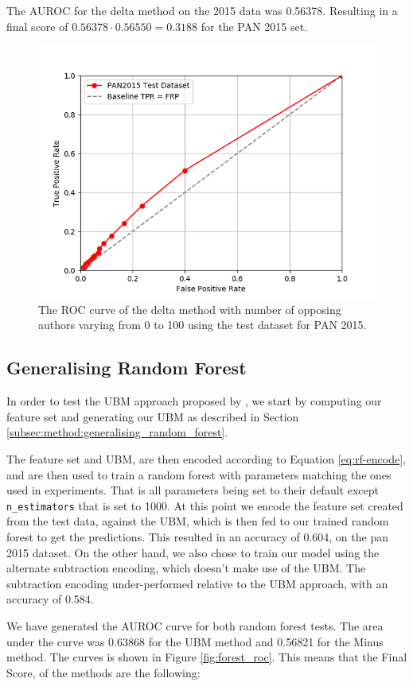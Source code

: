 The \gls{AUROC} for the delta method on the 2015 data was 0.56378. Resulting
in a final score of $0.56378 \cdot 0.56550 = 0.3188$ for the PAN 2015 set.

\begin{figure}
    \centering
    \includegraphics[width=.7\textwidth]{./pictures/delta_method_roc.png}
    \caption{The ROC curve of the delta method with number of opposing authors
    varying from 0 to 100 using the test dataset for PAN 2015.}
    \label{fig:delta_method_roc}
\end{figure}

\subsection{Generalising Random Forest} \label{subsec:results:generalising_random_forest}
In order to test the \gls{UBM} approach proposed by \cite{pacheco2015}, we start
by computing our feature set and generating our \gls{UBM} as described in
Section \ref{subsec:method:generalising_random_forest}.

The feature set and \gls{UBM}, are then encoded according to Equation
\eqref{eq:rf-encode}, and are then used to train a random forest with parameters
matching the ones used in experiments. That is all parameters being set to their
default except \texttt{n\_estimators} that is set to 1000. At this point we
encode the feature set created from the test data, against the \gls{UBM}, which
is then fed to our trained random forest to get the predictions. This resulted
in an accuracy of 0.604, on the pan 2015 dataset. On the other hand, we also
chose to train our model using the alternate subtraction encoding, which doesn't
make use of the \gls{UBM}. The subtraction encoding under-performed relative to
the \gls{UBM} approach, with an accuracy of 0.584.

We have generated the \gls{AUROC} curve for both random forest tests. The area
under the curve was 0.63868 for the \gls{UBM} method and 0.56821 for the Minus
method. The curves is shown in Figure \ref{fig:forest_roc}. 
This means that the Final Score, of the methods are the following:

